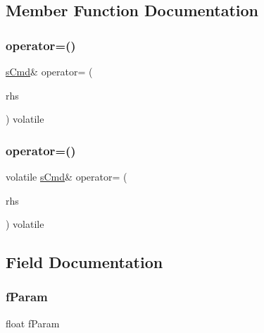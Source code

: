 \subsection{Member Function Documentation}
\mbox{\label{structs_cmd_a3b1f47c680cdde48d2c8679599547516}} 
\subsubsection{\texorpdfstring{operator=()}{operator=()}\hspace{0.1cm}{\footnotesize\ttfamily [1/2]}}
{\footnotesize\ttfamily \mbox{\hyperlink{structs_cmd}{s\+Cmd}}\& operator= (\begin{DoxyParamCaption}\item[{const volatile \mbox{\hyperlink{structs_cmd}{s\+Cmd}} \&}]{rhs }\end{DoxyParamCaption}) volatile\hspace{0.3cm}{\ttfamily [inline]}}

\mbox{\label{structs_cmd_a88ec1d5b2730bd3e2e2c9902c3ccde34}} 
\subsubsection{\texorpdfstring{operator=()}{operator=()}\hspace{0.1cm}{\footnotesize\ttfamily [2/2]}}
{\footnotesize\ttfamily volatile \mbox{\hyperlink{structs_cmd}{s\+Cmd}}\& operator= (\begin{DoxyParamCaption}\item[{const \mbox{\hyperlink{structs_cmd}{s\+Cmd}} \&}]{rhs }\end{DoxyParamCaption}) volatile\hspace{0.3cm}{\ttfamily [inline]}}



\subsection{Field Documentation}
\mbox{\label{structs_cmd_af05b89ac7edf2c67bb3386c902369313}} 
\subsubsection{\texorpdfstring{fParam}{fParam}}
{\footnotesize\ttfamily float f\+Param}



